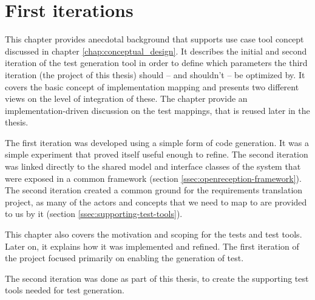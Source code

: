 \chapter{First iterations}
\label{chapter:first-iterations}
This chapter provides anecdotal background that supports use case tool concept discussed in chapter \ref{chap:conceptual_design}. It describes the initial and second iteration of the test generation tool in order to define which parameters the third iteration (the project of this thesis) should -- and shouldn't -- be optimized by. It covers the basic concept of implementation mapping and presents two different views on the level of integration of these. The chapter provide an implementation-driven discussion on the test mappings, that is reused later in the thesis.\medskip

\noindent The first iteration was developed using a simple form of code generation. It was a simple experiment that proved itself useful enough to refine. The second iteration was linked directly to the shared model and interface classes of the system that were exposed in a common framework (section \ref{ssec:openreception-framework}). The second iteration created a common ground for the requirements translation project, as many of the actors and concepts that we need to map to are provided to us by it (section \ref{ssec:supporting-test-tools}).\medskip

\noindent This chapter also covers the motivation and scoping for the tests and test tools. Later on, it explains how it was implemented and refined. The first iteration of the project focused primarily on enabling the generation of test.\medskip

\noindent The second iteration was done as part of this thesis, to create the supporting test tools needed for test generation.

